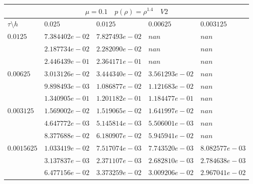 \documentclass[a4paper,12pt]{extarticle}
\begin{document}
\begin{tabular}{|l|l|l|l|l|}
	\hline
	\multicolumn{5}{|c|}{$\mu =0.1 \quad  p(\rho) = \rho^{1.4} \quad V2$}\\
	\hline
	$\tau\setminus h$ & $0.025$ & $0.0125$ & $0.00625$ & $0.003125$\\
	\hline
	$0.0125$  & $7.384402e-02$ & $7.827493e-02$ & $nan$ & $nan$\\
	& $2.187734e-02$ & $2.282090e-02$ & $nan$ & $nan$\\
	& $2.446439e-01$ & $2.364171e-01$ & $nan$ & $nan$\\
	\hline
	$0.00625$  & $3.013126e-02$ & $3.444340e-02$ & $3.561293e-02$ & $nan$\\
	& $9.898493e-03$ & $1.086877e-02$ & $1.121683e-02$ & $nan$\\
	& $1.340905e-01$ & $1.201182e-01$ & $1.184477e-01$ & $nan$\\
	\hline
	$0.003125$  & $1.569002e-02$ & $1.519065e-02$ & $1.641997e-02$ & $nan$\\
	& $4.647772e-03$ & $5.145814e-03$ & $5.506001e-03$ & $nan$\\
	& $8.377688e-02$ & $6.180907e-02$ & $5.945941e-02$ & $nan$\\
	\hline
	$0.0015625$  & $1.033419e-02$ & $7.517074e-03$ & $7.743520e-03$ & $8.082577e-03$\\
	& $3.137837e-03$ & $2.371107e-03$ & $2.682810e-03$ & $2.784638e-03$\\
	& $6.477156e-02$ & $3.373259e-02$ & $3.009206e-02$ & $2.967041e-02$\\
	\hline
\end{tabular}
\end{document}
